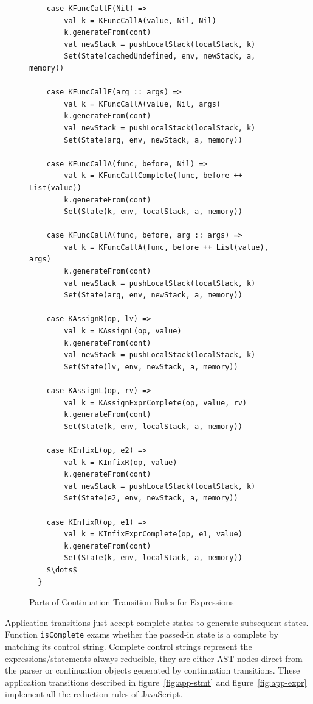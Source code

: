 \documentclass{article}
\begin{document}
\begin{figure}
\lstset{language=Scala, mathescape}
\begin{lstlisting}
    case KFuncCallF(Nil) =>
        val k = KFuncCallA(value, Nil, Nil)
        k.generateFrom(cont)
        val newStack = pushLocalStack(localStack, k)
        Set(State(cachedUndefined, env, newStack, a, memory))

    case KFuncCallF(arg :: args) =>
        val k = KFuncCallA(value, Nil, args)
        k.generateFrom(cont)
        val newStack = pushLocalStack(localStack, k)
        Set(State(arg, env, newStack, a, memory))

    case KFuncCallA(func, before, Nil) =>
        val k = KFuncCallComplete(func, before ++ List(value))
        k.generateFrom(cont)
        Set(State(k, env, localStack, a, memory))

    case KFuncCallA(func, before, arg :: args) =>
        val k = KFuncCallA(func, before ++ List(value), args)
        k.generateFrom(cont)
        val newStack = pushLocalStack(localStack, k)
        Set(State(arg, env, newStack, a, memory))

    case KAssignR(op, lv) =>
        val k = KAssignL(op, value)
        k.generateFrom(cont)
        val newStack = pushLocalStack(localStack, k)
        Set(State(lv, env, newStack, a, memory))

    case KAssignL(op, rv) =>
        val k = KAssignExprComplete(op, value, rv)
        k.generateFrom(cont)
        Set(State(k, env, localStack, a, memory))

    case KInfixL(op, e2) =>
        val k = KInfixR(op, value)
        k.generateFrom(cont)
        val newStack = pushLocalStack(localStack, k)
        Set(State(e2, env, newStack, a, memory))

    case KInfixR(op, e1) =>
        val k = KInfixExprComplete(op, e1, value)
        k.generateFrom(cont)
        Set(State(k, env, localStack, a, memory))
    $\dots$
  }
\end{lstlisting}
\caption{Parts of Continuation Transition Rules for Expressions}
\label{fig:cont-expr}
\end{figure}

Application transitions just accept complete states to generate subsequent states. Function \verb|isComplete| exams whether the passed-in state is a complete by matching its control string. Complete control strings represent the expressions/statements always reducible, they are either AST nodes direct from the parser or continuation objects generated by continuation transitions. These application transitions described in figure~\ref{fig:app-stmt} and figure~\ref{fig:app-expr} implement all the reduction rules of JavaScript.
\end{document}
